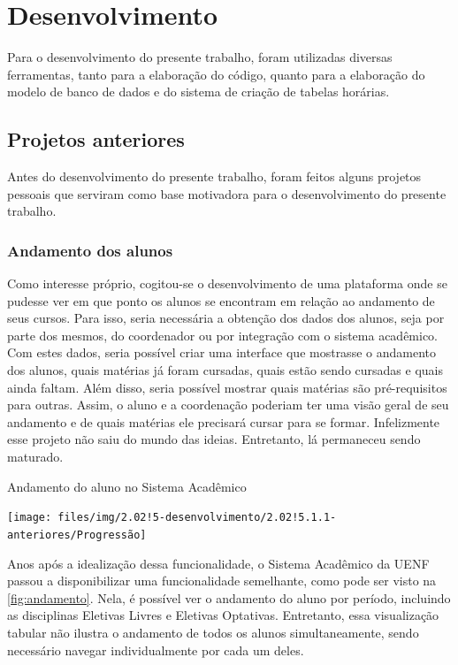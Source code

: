 \chapter{Desenvolvimento} \label{chap:desenvolvimento}

Para o desenvolvimento do presente trabalho, foram utilizadas diversas ferramentas, tanto para a elaboração do código, quanto para a elaboração do modelo de banco de dados e do sistema de criação de tabelas horárias.

\section{Projetos anteriores} %

Antes do desenvolvimento do presente trabalho, foram feitos alguns projetos pessoais que serviram como base motivadora para o desenvolvimento do presente trabalho.

\subsection{Andamento dos alunos} %

Como interesse próprio, cogitou-se o desenvolvimento de uma plataforma onde se pudesse ver em que ponto os alunos se encontram em relação ao andamento de seus cursos. Para isso, seria necessária a obtenção dos dados dos alunos, seja por parte dos mesmos, do coordenador ou por integração com o sistema acadêmico. Com estes dados, seria possível criar uma interface que mostrasse o andamento dos alunos, quais matérias já foram cursadas, quais estão sendo cursadas e quais ainda faltam. Além disso, seria possível mostrar quais matérias são pré-requisitos para outras. Assim, o aluno e a coordenação poderiam ter uma visão geral de seu andamento e de quais matérias ele precisará cursar para se formar. Infelizmente esse projeto não saiu do mundo das ideias. Entretanto, lá permaneceu sendo maturado.

\begin{MyCenteredFigure}
  \caption{Andamento do aluno no Sistema Acadêmico}
  \label{fig:andamento}
  \texttt{[image: files/img/2.02!5-desenvolvimento/2.02!5.1.1-anteriores/Progressão]}
\end{MyCenteredFigure}

Anos após a idealização dessa funcionalidade, o Sistema Acadêmico da UENF passou a disponibilizar uma funcionalidade semelhante, como pode ser visto na \autoref{fig:andamento}. Nela, é possível ver o andamento do aluno por período, incluindo as disciplinas Eletivas Livres e Eletivas Optativas. Entretanto, essa visualização tabular não ilustra o andamento de todos os alunos simultaneamente, sendo necessário navegar individualmente por cada um deles.

